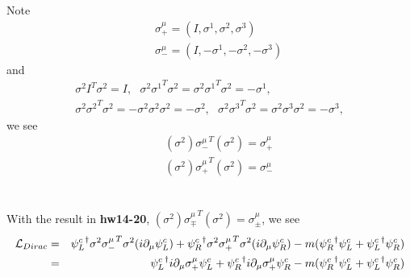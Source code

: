 \documentclass[11pt]{article}
\def\del{{\partial}}
\begin{document}
\section{ }
Note 
\begin{eqnarray}
    &&\sigma_+^\mu =(I,\sigma^1,\sigma^2,\sigma^3) \\
    &&\sigma_-^\mu =(I,-\sigma^1,-\sigma^2,-\sigma^3)
\end{eqnarray}
and
\begin{eqnarray}
    \sigma^2 I^T \sigma^2 = I,~~~\sigma^2 {\sigma^1}^T \sigma^2= \sigma^2 {\sigma^1}^T \sigma^2= -\sigma^1,\\
    \sigma^2 {\sigma^2}^T \sigma^2=-\sigma^2 \sigma^2 \sigma^2=-\sigma^2,~~~\sigma^2 {\sigma^3}^T \sigma^2=\sigma^2 \sigma^3 \sigma^2=-\sigma^3,
\end{eqnarray}
we see
\begin{eqnarray}
    &&(\sigma^2) {\sigma_-^\mu}^T (\sigma^2) = \sigma_+^\mu  \\
    && (\sigma^2) {\sigma_+^\mu}^T (\sigma^2) = \sigma_-^\mu 
\end{eqnarray}
  
\section{ }
With the result in {\bf hw14-20}, $(\sigma^2) {\sigma_\mp^\mu}^T (\sigma^2) = \sigma_\pm^\mu $, we see
\begin{eqnarray}
    {\cal L}_{Dirac}&=& {\psi_L^c}^\dagger \sigma^2 {\sigma_-^\mu}^T \sigma^2 ( i\del_\mu {\psi_L^c})+{\psi_R^c}^\dagger \sigma^2 {\sigma_+^\mu}^T \sigma^2(i\del_\mu {\psi_R^c}) - m( {\psi_R^c}^\dagger{\psi_L^c} + {\psi_L^c}^\dagger {\psi_R^c}) \\
    &=& {\psi_L^c}^\dagger i\del_\mu {\sigma_+^\mu} {\psi_L^c}+{\psi_R^c}^\dagger i\del_\mu  {\sigma_+^\mu} {\psi_R^c} - m( {\psi_R^c}^\dagger{\psi_L^c} + {\psi_L^c}^\dagger {\psi_R^c})
\end{eqnarray}
\end{document}
